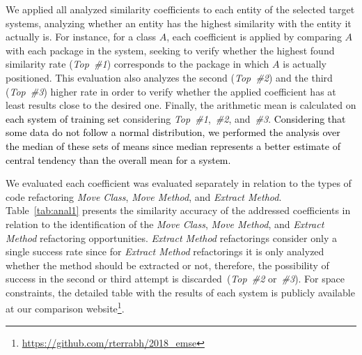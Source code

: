 \documentclass[smallextended,natbib]{svjour3}
\begin{document}
{We applied all analyzed similarity coefficients to each entity of the selected target systems, analyzing whether an entity has the highest similarity with the entity it actually is. For instance, for a class $A$, each coefficient is applied by comparing $A$ with each package in the system, seeking to verify whether the highest found similarity rate (\textit{Top~\#1}) corresponds to the package in which $A$ is actually positioned. This evaluation also analyzes the second (\textit{Top~\#2}) and the third (\textit{Top~\#3}) higher rate in order to verify whether the applied coefficient has at least results close to the desired one. Finally, the arithmetic mean is calculated on \textcolor{black}{each system of training set} considering \textit{Top~\#1},~\textit{\#2}, and~\textit{\#3}. \textcolor{black}{Considering that some data do not follow a normal distribution, we performed the analysis over the median of these sets of means since median represents a better estimate of central tendency than the overall mean for a system.}


We evaluated each coefficient was evaluated separately in relation to the types of code refactoring \textit{Move Class}, \textit{Move Method}, and \textit{Extract Method}. Table~\ref{tab:anal1} presents the similarity accuracy of the addressed coefficients in relation to the identification of the \textit{Move Class}, \textit{Move Method}, and \textit{Extract Method} refactoring opportunities. \textit{Extract Method} refactorings consider only a single success rate since for \textit{Extract Method} refactorings it is only analyzed whether the method should be extracted or not, therefore, the possibility of success in the second or third attempt is discarded~(\textit{Top~\#2} or~\textit{\#3}). For space constraints, the detailed table with the results of each system is publicly available at our comparison website\footnote{\url{https://github.com/rterrabh/2018_emse}}.


}
\end{document}
